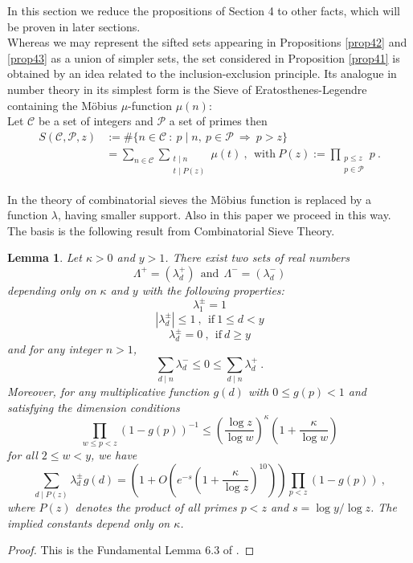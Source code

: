 \documentclass{amsart}
\newtheorem{lemma}[theorem]{Lemma}
\numberwithin{equation}{subsection}
\begin{document}
In this section we reduce the propositions of Section 4 to other facts, which will be proven in later sections.\\
Whereas we may represent the sifted sets appearing in Propositions \ref{prop42} and  \ref{prop43} as a union of simpler sets, the set considered in Proposition \ref{prop41} is obtained by an idea related to the inclusion-exclusion principle. Its analogue in number theory in its simplest form is the Sieve of Eratosthenes-Legendre containing the M\"obius $\mu$-function $\mu(n)$:\\
Let $\mathcal{C}$ be a set of integers and $\mathcal{P}$ a set of primes then 
\begin{align*}
S(\mathcal{C}, \mathcal{P}, z)&:=\#\{n\in \mathcal{C}\::\: p\mid n,\ p\in \mathcal{P}\ \Rightarrow \ p>z\}\\
&=\sum_{n\in \mathcal{C}}\sum_{\substack{t\mid n \\ t\mid P(z)}}\mu (t)\:,\ \ \text{with}\ P(z):=\prod_{\substack{p\leq z \\ p\in \mathcal{P}}} p\:.
\end{align*}

In the theory of combinatorial sieves the M\"obius function is replaced by a function $\lambda$, having smaller support. Also in this paper we proceed in this way. The basis is the following result from Combinatorial Sieve Theory.

\begin{lemma}\label{rlem61}
Let $\kappa>0$ and $y>1$. There exist two sets of real numbers 
$$\Lambda^+=(\lambda^+_d)\ \ \text{and}\ \ \Lambda^-=(\lambda^-_d)$$
depending only on $\kappa$ and $y$ with the following properties:
\[
\lambda_1^{\pm}=1 \tag{6.1}
\]
\[
|\lambda_d^{\pm}| \leq 1\:,\ \ \text{if}\ 1\leq d< y \tag{6.2}
\]
\[
\lambda_d^{\pm}=0\:,\ \ \text{if}\ d\geq  y \tag{6.2}
\]
and for any integer $n>1$,
\[ 
\sum_{d\mid n} \lambda_d^-  \leq 0  \leq \sum_{d\mid n} \lambda_d^+\:.  \tag{6.3}
\]
Moreover, for any multiplicative function $g(d)$ with $0\leq g(p)<1$ and satisfying the dimension conditions 
$$\prod_{w\leq p< z} (1-g(p))^{-1}\leq \left(\frac{\log z}{\log w}\right)^\kappa \left(1+\frac{\kappa}{\log w}\right)$$
for all $2\leq w< y$, we have
$$\sum_{d \mid P(z)} \lambda_d^\pm g(d)=\left(1+O\left(e^{-s}\left(1+\frac{\kappa}{\log z}\right)^{10}\right)\right)\prod_{p< z} (1-g(p))\:,$$
where $P(z)$ denotes the product of all primes $p<z$ and $s=\log y/\log z$. The implied constants depend only on $\kappa$.
\end{lemma}
\begin{proof}
This is the Fundamental Lemma 6.3 of \cite{IKW}.
\end{proof}
\end{document}
